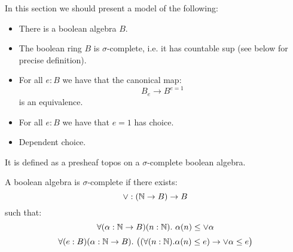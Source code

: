In this section we should present a model of the following:

\begin{itemize}
\item There is a boolean algebra $B$.
\item The boolean ring $B$ is $\sigma$-complete, i.e. it has countable sup (see below for precise definition).
\item For all $e:B$ we have that the canonical map:
\[B_e \to B^{e=1}\]
is an equivalence.
\item For all $e:B$ we have that $e=1$ has choice.
\item Dependent choice.
\end{itemize}

It is defined as a presheaf topos on a $\sigma$-complete boolean algebra.

\begin{definition}
A boolean algebra is $\sigma$-complete if there exists:
\[\lor : (\mathbb{N}\to B) \to B\]
such that:
\[\forall (\alpha:\mathbb{N}\to B)(n:\mathbb{N}).\ \alpha(n)\leq \lor\alpha\]
\[\forall (e:B)(\alpha:\N\to B).\ \big((\forall(n:\N). \alpha(n)\leq e) \to \lor \alpha \leq e\big)\]
\end{definition}

